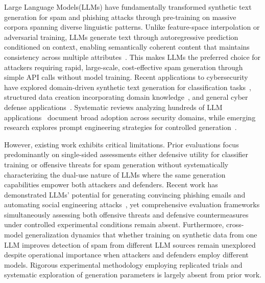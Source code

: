 Large Language Models(LLMs) have fundamentally transformed synthetic text generation for spam and phishing attacks through pre-training on massive corpora spanning diverse linguistic patterns. Unlike feature-space interpolation or adversarial training, LLMs generate text through autoregressive prediction conditioned on context, enabling semantically coherent content that maintains consistency across multiple attributes~\cite{razmyslovich2025eltex,almorjan2025large}. This makes LLMs the preferred choice for attackers requiring rapid, large-scale, cost-effective spam generation through simple API calls without model training. Recent applications to cybersecurity have explored domain-driven synthetic text generation for classification tasks~\cite{razmyslovich2025eltex,zhang2025llms}, structured data creation incorporating domain knowledge~\cite{almorjan2025large}, and general cyber defense applications~\cite{ammara2024synthetic}. Systematic reviews analyzing hundreds of LLM applications~\cite{zhang2025llms,ding2023tmg} document broad adoption across security domains, while emerging research explores prompt engineering strategies for controlled generation~\cite{chen2025unleashing,de2023unsupervised}.

However, existing work exhibits critical limitations. Prior evaluations focus predominantly on single-sided assessments either defensive utility for classifier training or offensive threats for spam generation without systematically characterizing the dual-use nature of LLMs where the same generation capabilities empower both attackers and defenders. Recent work has demonstrated LLMs' potential for generating convincing phishing emails and automating social engineering attacks~\cite{bethany2024large,afane2024next,weinz2025impact,ai2024defending,thapa2025large}, yet comprehensive evaluation frameworks simultaneously assessing both offensive threats and defensive countermeasures under controlled experimental conditions remain absent. Furthermore, cross-model generalization dynamics that whether training on synthetic data from one LLM improves detection of spam from different LLM sources remain unexplored despite operational importance when attackers and defenders employ different models. Rigorous experimental methodology employing replicated trials and systematic exploration of generation parameters is largely absent from prior work.

